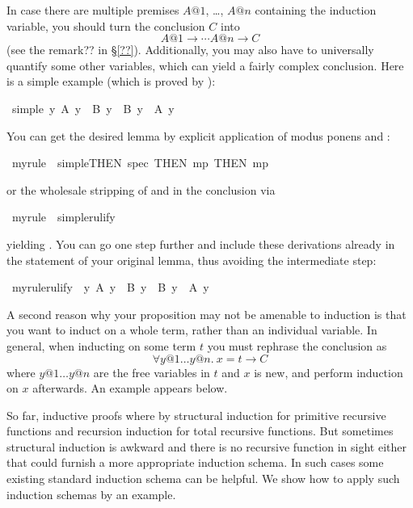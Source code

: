 \begin{isabellebody}
\begin{isamarkuptext}
In case there are multiple premises $A@1$, \dots, $A@n$ containing the
induction variable, you should turn the conclusion $C$ into
\[ A@1 \longrightarrow \cdots A@n \longrightarrow C \]
(see the remark?? in \S\ref{??}).
Additionally, you may also have to universally quantify some other variables,
which can yield a fairly complex conclusion.
Here is a simple example (which is proved by ):%
\end{isamarkuptext}%
\ simple{\isacharcolon}\ {\isachardoublequote}{\isasymforall}y{\isachardot}\ A\ y\ {\isasymlongrightarrow}\ B\ y\ {\isasymlongrightarrow}\ B\ y\ {\isacharampersand}\ A\ y{\isachardoublequote}%
\begin{isamarkuptext}%
\noindent
You can get the desired lemma by explicit
application of modus ponens and :%
\end{isamarkuptext}%
\ myrule\ {\isacharequal}\ simple{\isacharbrackleft}THEN\ spec{\isacharcomma}\ THEN\ mp{\isacharcomma}\ THEN\ mp{\isacharbrackright}%
\begin{isamarkuptext}%
\noindent
or the wholesale stripping of \isa{\isasymforall} and
\isa{\isasymlongrightarrow} in the conclusion via %
\end{isamarkuptext}%
\ myrule\ {\isacharequal}\ simple{\isacharbrackleft}rulify{\isacharbrackright}%
\begin{isamarkuptext}%
\noindent
yielding .
You can go one step further and include these derivations already in the
statement of your original lemma, thus avoiding the intermediate step:%
\end{isamarkuptext}%
\ myrule{\isacharbrackleft}rulify{\isacharbrackright}{\isacharcolon}\ \ {\isachardoublequote}{\isasymforall}y{\isachardot}\ A\ y\ {\isasymlongrightarrow}\ B\ y\ {\isasymlongrightarrow}\ B\ y\ {\isacharampersand}\ A\ y{\isachardoublequote}%
\begin{isamarkuptext}%
\bigskip

A second reason why your proposition may not be amenable to induction is that
you want to induct on a whole term, rather than an individual variable. In
general, when inducting on some term $t$ you must rephrase the conclusion as
\[ \forall y@1 \dots y@n.~ x = t \longrightarrow C \] where $y@1 \dots y@n$
are the free variables in $t$ and $x$ is new, and perform induction on $x$
afterwards. An example appears below.%
\end{isamarkuptext}%
%
%
\begin{isamarkuptext}%
So far, inductive proofs where by structural induction for
primitive recursive functions and recursion induction for total recursive
functions. But sometimes structural induction is awkward and there is no
recursive function in sight either that could furnish a more appropriate
induction schema. In such cases some existing standard induction schema can
be helpful. We show how to apply such induction schemas by an example.


\end{isamarkuptext}
\end{isabellebody}
